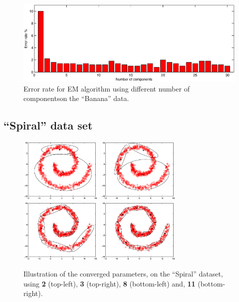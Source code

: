\documentclass[a4paper,11pt]{article}
\begin{document}
\begin{figure}[h!]
  \centering   
      \includegraphics[width=1\textwidth]{figures/1-30components.eps}      
  \caption{Error rate for EM algorithm using different number of componentson the ``Banana'' data.}
  \label{fig30comp}
\end{figure}

\subsection*{``Spiral'' data set}
\begin{figure}[b!]
  \centering   
      \includegraphics[width=0.35\textwidth]{figures/2compSp.eps}\	
      \includegraphics[width=0.35\textwidth]{figures/3compSp.eps}\	
      \includegraphics[width=0.35\textwidth]{figures/8compSp.eps}\	
      \includegraphics[width=0.35\textwidth]{figures/11compSp.eps}    
  \caption{Illustration of the converged parameters, on the ``Spiral'' dataset, using \textbf{2} (top-left), \textbf{3} (top-right), \textbf{8} (bottom-left) and, \textbf{11} (bottom-right).}
  \label{fig23430compSp}
\end{figure}
\end{document}

